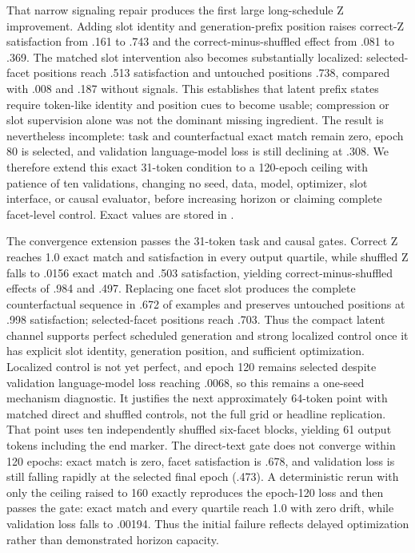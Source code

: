 \documentclass[11pt]{article}
\begin{document}
That narrow signaling repair produces the first large long-schedule Z improvement. Adding slot identity and generation-prefix position raises correct-Z satisfaction from .161 to .743 and the correct-minus-shuffled effect from .081 to .369. The matched slot intervention also becomes substantially localized: selected-facet positions reach .513 satisfaction and untouched positions .738, compared with .008 and .187 without signals. This establishes that latent prefix states require token-like identity and position cues to become usable; compression or slot supervision alone was not the dominant missing ingredient. The result is nevertheless incomplete: task and counterfactual exact match remain zero, epoch 80 is selected, and validation language-model loss is still declining at .308. We therefore extend this exact 31-token condition to a 120-epoch ceiling with patience of ten validations, changing no seed, data, model, optimizer, slot interface, or causal evaluator, before increasing horizon or claiming complete facet-level control. Exact values are stored in .

The convergence extension passes the 31-token task and causal gates. Correct Z reaches 1.0 exact match and satisfaction in every output quartile, while shuffled Z falls to .0156 exact match and .503 satisfaction, yielding correct-minus-shuffled effects of .984 and .497. Replacing one facet slot produces the complete counterfactual sequence in .672 of examples and preserves untouched positions at .998 satisfaction; selected-facet positions reach .703. Thus the compact latent channel supports perfect scheduled generation and strong localized control once it has explicit slot identity, generation position, and sufficient optimization. Localized control is not yet perfect, and epoch 120 remains selected despite validation language-model loss reaching .0068, so this remains a one-seed mechanism diagnostic. It justifies the next approximately 64-token point with matched direct and shuffled controls, not the full grid or headline replication. That point uses ten independently shuffled six-facet blocks, yielding 61 output tokens including the end marker. The direct-text gate does not converge within 120 epochs: exact match is zero, facet satisfaction is .678, and validation loss is still falling rapidly at the selected final epoch (.473). A deterministic rerun with only the ceiling raised to 160 exactly reproduces the epoch-120 loss and then passes the gate: exact match and every quartile reach 1.0 with zero drift, while validation loss falls to .00194. Thus the initial failure reflects delayed optimization rather than demonstrated horizon capacity.
\end{document}
